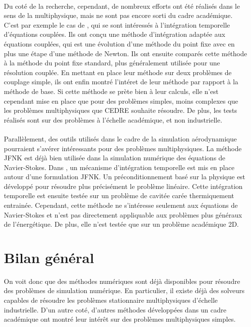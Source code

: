     \paragraph{}
    Du coté de la recherche, cependant, de nombreux efforts ont été réalisés dans le sens de la multiphysique, mais ne sont pas encore sorti du cadre académique.
    C'est par exemple le cas de \cite{WongKwokHorneEtAl2019}, qui se sont intéressés à l'intégration temporelle d'équations couplées.
    Ils ont conçu une méthode d'intégration adaptée aux équations couplées, qui est une évolution d'une méthode du point fixe avec en plus une étape d'une méthode de Newton.
    Ils ont ensuite comparés cette méthode à la méthode du point fixe standard, plus généralement utilisée pour une résolution couplée.
    En mettant en place leur méthode sur deux problèmes de couplage simple, ils ont enfin montré l'intéret de leur méthode par rapport à la méthode de base.
    Si cette méthode se prète bien à leur calculs, elle n'est cependant mise en place que pour des problèmes simples, moins complexes que les problèmes multiphysiques que CEDRE souhaite résoudre.
    De plus, les tests réalisés sont sur des problèmes à l'échelle académique, et non industrielle.

    \paragraph{}
    Parallèlement, des outils utilisés dans le cadre de la simulation aérodynamique pourraient s'avérer intéressants pour des problèmes multiphysiques.
    La méthode JFNK est déjà bien utilisée dans la simulation numérique des équations de Navier-Stokes.
    Dans \cite{ParkNourgalievMartineauEtAl2009}, un mécanisme d'intégration temporelle est mis en place autour d'une formulation JFNK.
    Un préconditionnement basé sur la physique est développé pour résoudre plus précisément le problème linéaire.
    Cette intégration temporelle est ensuite testée sur un problème de cavitée carée thermiquement entrainée.
    Cependant, cette méthode ne s'intéresse seulement aux équations de Navier-Stokes et n'est pas directement appliquable aux problèmes plus généraux de l'énergétique.
    De plus, elle n'est testée que sur un problème académique 2D.

  \section*{Bilan général}

    \paragraph{}
    On voit donc que des méthodes numériques sont déjà disponibles pour résoudre des problèmes de simulation numérique.
    En particulier, il existe déjà des solveurs capables de résoudre les problèmes stationnaire multiphysiques d'échelle industrielle.
    D'un autre coté, d'autres méthodes développées dans un cadre académique ont montré leur intérêt sur des problèmes multiphysiques simples.

